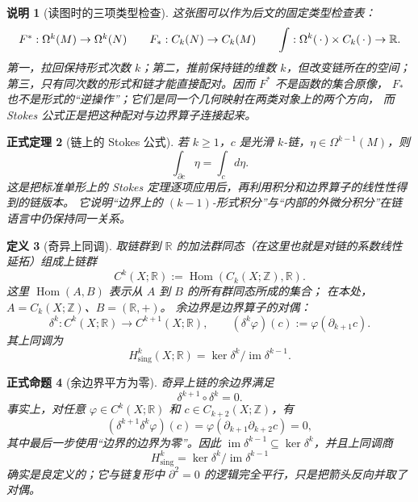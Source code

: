 \documentclass[UTF8,fontset=none,a4paper,11pt]{ctexart}
\theoremstyle{foundation-definition}
\newtheorem{definition}{定义}[section]
\theoremstyle{foundation-theorem}
\newtheorem{theorem}[definition]{正式定理}
\theoremstyle{foundation-proposition}
\newtheorem{proposition}[definition]{正式命题}
\theoremstyle{foundation-example}
\theoremstyle{foundation-remark}
\newtheorem{remark}[definition]{说明}
\theoremstyle{foundation-theorem}
\begin{document}
\begin{remark}[读图时的三项类型检查]\label{rem:pullback-pushforward-types}
这张图可以作为后文的固定类型检查表：
\[
\begin{array}{c@{\qquad}c@{\qquad}c}
F^*:\Omega^k(M)\to\Omega^k(N)
&
F_*:C_k(N)\to C_k(M)
&
\displaystyle\int:\Omega^k(\,\cdot\,)\times C_k(\,\cdot\,)\to\mathbb R .
\end{array}
\]
第一，拉回保持形式次数 \(k\)；第二，推前保持链的维数 \(k\)，但改变链所在的空间；
第三，只有同次数的形式和链才能直接配对。因而 \(F^*\) 不是函数的集合原像，
\(F_*\) 也不是形式的“逆操作”；它们是同一个几何映射在两类对象上的两个方向，
而 Stokes 公式正是把这种配对与边界算子连接起来。
\end{remark}

\begin{theorem}[链上的 Stokes 公式]\label{thm:chain-stokes}
若 \(k\geq1\)，\(c\) 是光滑 \(k\)-链，\(\eta\in\Omega^{k-1}(M)\)，则
\[
\int_{\partial c}\eta=\int_c d\eta.
\]
这是把标准单形上的 Stokes 定理逐项应用后，再利用积分和边界算子的线性性得到的链版本。
它说明“边界上的 \((k-1)\)-形式积分”与“内部的外微分积分”在链语言中仍保持同一关系。
\end{theorem}

\begin{definition}[奇异上同调]\label{def:singular-cohomology}
取链群到 \(\mathbb R\) 的加法群同态（在这里也就是对链的系数线性延拓）组成上链群
\[
C^k(X;\mathbb R):=\operatorname{Hom}(C_k(X;\mathbb Z),\mathbb R).
\]
这里 \(\operatorname{Hom}(A,B)\) 表示从 \(A\) 到 \(B\) 的所有群同态所成的集合；
在本处，\(A=C_k(X;\mathbb Z)\)、\(B=(\mathbb R,+)\)。
余边界是边界算子的对偶：
\[
\delta^k:C^k(X;\mathbb R)\to C^{k+1}(X;\mathbb R),
\qquad
(\delta^k\varphi)(c):=\varphi(\partial_{k+1}c).
\]
其上同调为
\[
H^k_{\mathrm{sing}}(X;\mathbb R)
=\ker\delta^k/\operatorname{im}\delta^{k-1}.
\]
\end{definition}

\begin{proposition}[余边界平方为零]\label{prop:cochain-square-zero}
奇异上链的余边界满足
\[
\delta^{k+1}\circ\delta^k=0.
\]
事实上，对任意 \(\varphi\in C^k(X;\mathbb R)\) 和 \(c\in C_{k+2}(X;\mathbb Z)\)，有
\[
(\delta^{k+1}\delta^k\varphi)(c)
=\varphi(\partial_{k+1}\partial_{k+2}c)=0,
\]
其中最后一步使用“边界的边界为零”。因此
\(\operatorname{im}\delta^{k-1}\subseteq\ker\delta^k\)，并且上同调商
\[
H^k_{\mathrm{sing}}=\ker\delta^k/\operatorname{im}\delta^{k-1}
\]
确实是良定义的；它与链复形中 \(\partial^2=0\) 的逻辑完全平行，只是把箭头反向并取了对偶。
\end{proposition}
\end{document}
